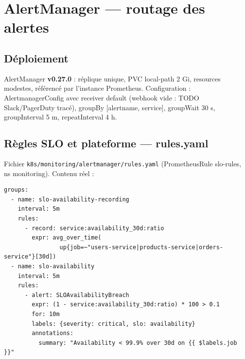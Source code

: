 \documentclass[12pt,a4paper,twoside,openright]{report}
\begin{document}
\section{AlertManager --- routage des alertes}

\subsection{Déploiement}
AlertManager \textbf{v0.27.0} : réplique unique, PVC local-path 2 Gi, resources modestes, référencé par l'instance Prometheus. Configuration : AlertmanagerConfig avec receiver default (webhook vide : TODO Slack/PagerDuty tracé), groupBy [alertname, service], groupWait 30 s, groupInterval 5 m, repeatInterval 4 h.

\subsection{Règles SLO et plateforme --- rules.yaml}
Fichier \texttt{k8s/monitoring/alertmanager/rules.yaml} (PrometheusRule slo-rules, ns monitoring). Contenu réel :

\begin{lstlisting}[caption={Recording rule + alerte disponibilité : extraits exacts}]
groups:
  - name: slo-availability-recording
    interval: 5m
    rules:
      - record: service:availability_30d:ratio
        expr: avg_over_time(
                up{job=~"users-service|products-service|orders-service"}[30d])
  - name: slo-availability
    interval: 5m
    rules:
      - alert: SLOAvailabilityBreach
        expr: (1 - service:availability_30d:ratio) * 100 > 0.1
        for: 10m
        labels: {severity: critical, slo: availability}
        annotations:
          summary: "Availability < 99.9% over 30d on {{ $labels.job }}"
\end{lstlisting}
\end{document}
